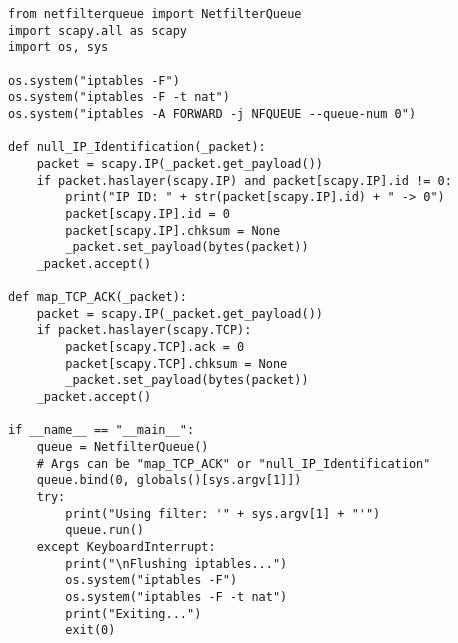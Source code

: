 \begin{listing}
    \vspace{0.5cm}
    \begin{verbatim}
from netfilterqueue import NetfilterQueue
import scapy.all as scapy
import os, sys

os.system("iptables -F")
os.system("iptables -F -t nat")
os.system("iptables -A FORWARD -j NFQUEUE --queue-num 0")

def null_IP_Identification(_packet):
    packet = scapy.IP(_packet.get_payload())
    if packet.haslayer(scapy.IP) and packet[scapy.IP].id != 0:
        print("IP ID: " + str(packet[scapy.IP].id) + " -> 0")
        packet[scapy.IP].id = 0
        packet[scapy.IP].chksum = None
        _packet.set_payload(bytes(packet))
    _packet.accept()

def map_TCP_ACK(_packet):
    packet = scapy.IP(_packet.get_payload())
    if packet.haslayer(scapy.TCP):
        packet[scapy.TCP].ack = 0
        packet[scapy.TCP].chksum = None
        _packet.set_payload(bytes(packet))
    _packet.accept()

if __name__ == "__main__":
    queue = NetfilterQueue()
    # Args can be "map_TCP_ACK" or "null_IP_Identification"
    queue.bind(0, globals()[sys.argv[1]])
    try:
        print("Using filter: '" + sys.argv[1] + "'")
        queue.run()
    except KeyboardInterrupt:
        print("\nFlushing iptables...")
        os.system("iptables -F")
        os.system("iptables -F -t nat")
        print("Exiting...")
        exit(0)
    \end{verbatim}
\end{listing}